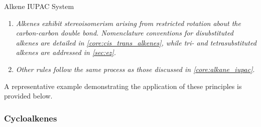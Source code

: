 \documentclass[10pt]{article}
\begin{document}
\begin{core}[label=core:alkene_iupac]{Alkene IUPAC System}
\begin{enumerate}[label=(\arabic*)]
          \item \textit{Alkenes exhibit stereoisomerism arising from restricted rotation about the carbon-carbon double bond. Nomenclature conventions for disubstituted alkenes are detailed in \autoref{core:cis_trans_alkenes}, while tri- and tetrasubstituted alkenes are addressed in \autoref{sec:ez}.}

          \item \textit{Other rules follow the same process as those discussed in \autoref{core:alkane_iupac}}.

        \end{enumerate}

        A representative example demonstrating the application of these principles is provided below.


      \end{core}

    \subsubsection{Cycloalkenes}
\end{document}
